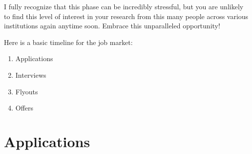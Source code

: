 \documentclass[12pt]{article}
\begin{document}
I fully recognize that this phase can be incredibly stressful, but you are unlikely to find this level of interest in your research from this many people across various institutions again anytime soon. Embrace this unparalleled opportunity!

Here is a basic timeline for the job market:
\begin{enumerate}
\item Applications
\item Interviews
\item Flyouts
\item Offers
\end{enumerate}

\section{Applications}
\label{sec:org2e682d9}
\end{document}
